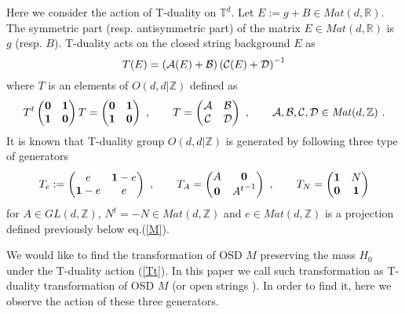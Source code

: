\documentclass[a4paper,12pt]{article}
\newcommand{\R}{{\mathbb{R}}}
\newcommand{\Z}{{\mathbb{Z}}}
\newcommand{\T}{{\mathbb{T}}}
\newcommand{\bp}{\begin{pmatrix}}
\newcommand{\ep}{\end{pmatrix}}
\def \cA{{\cal A}}
\def \cB{{\cal B}}
\def \cC{{\cal C}}
\def \cD{{\cal D}}
\def \cA{{\cal A}}
\def \0{{\bf 0}}
\def \1{{\bf 1}}
\def \Mat{\mathit{Mat}}
\begin{document}
Here we consider the action of T-duality on $\T^d$\cite{GPR}. 
Let $E:=g+B\in \Mat(d,\R)$. 
The symmetric part (resp. antisymmetric part) of the matrix 
$E\in \Mat(d,\R)$ is $g$ (resp. $B$).
T-duality acts on the closed string background $E$ as 
\begin{equation}
 T(E)=\left(\cA(E)+\cB\right)\left(\cC(E)+\cD\right)^{-1} \label{Tt}
\end{equation}
where $T$ is an elements of $O(d,d |\Z)$ defined as 
\begin{equation}
 T^t\bp {\bf 0}&{\bf 1}\\ {\bf 1}&{\bf 0}\ep T=
  \bp {\bf 0}&{\bf 1}\\ {\bf 1}&{\bf 0}\ep\ ,\qquad
 T=\bp \cA &\cB \\ \cC & \cD \ep \ ,
 \qquad \cA, \cB, \cC, \cD \in \Mat(d,\Z)\ . \label{T}
\end{equation}
It is known that T-duality group $O(d, d | \Z)$ is generated by  
following three type of generators \cite{GPR,S} 
\begin{equation}
 T_e:= \begin{pmatrix}
              e& \1-e \\
              \1-e & e
             \end{pmatrix}
 \ ,\qquad 
 T_A= \begin{pmatrix}
           A      & {\bf 0} \\
           {\bf 0}& {A^t}^{-1}  
          \end{pmatrix}
 \ ,\qquad 
 T_N= \begin{pmatrix}
          \1 & N  \\
          \0 & \1 
      \end{pmatrix}
 \label{gen}
\end{equation}
for $A\in \mathit{GL}(d,\Z)$, $N^t=-N\in\Mat(d,\Z)$ and
$e\in\Mat(d,\Z)$ is a projection defined previously below eq.(\ref{M}). 


We would like to find the transformation of OSD $M$ 
preserving the mass $H_0$ under the T-duality action (\ref{Tt}). 
In this paper we call such transformation as T-duality transformation 
of OSD $M$ (or open strings ). In order to find it, here we observe 
the action of these three generators. 
\end{document}
